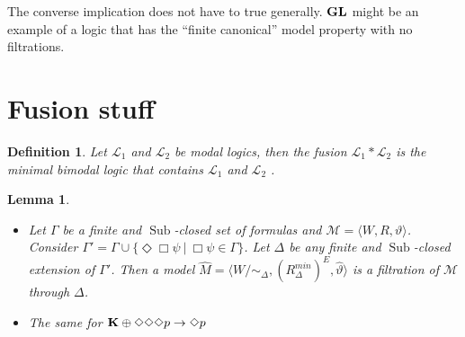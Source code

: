 \documentclass[a4paper]{article}
\theoremstyle{defin}
\newtheorem{defin}{Definition}
\theoremstyle{theorem}
\theoremstyle{prop}
\theoremstyle{lemma}
\newtheorem{lemma}{Lemma}
\theoremstyle{fact}
\theoremstyle{ex}
\theoremstyle{col}
\theoremstyle{claim}
\begin{document}
The converse implication does not have to true generally. ${\bf GL}$ might be an example of a logic that has the ``finite canonical'' model property with no filtrations.

\section{Fusion stuff}

\begin{defin}
  Let $\mathcal{L}_1$ and $\mathcal{L}_2$ be modal logics, then the fusion $\mathcal{L}_1 * \mathcal{L}_2$ is the minimal bimodal logic that contains $\mathcal{L}_1$ and $\mathcal{L}_2$ \cite{kurucz200715}.
\end{defin}

\begin{lemma}\label{extension}
  $ $

  \begin{itemize}
  \item Let $\Gamma$ be a finite and $\operatorname{Sub}$-closed set of formulas and $\mathcal{M} = \langle W, R, \vartheta \rangle$. Consider $\Gamma' = \Gamma \cup \{ \Diamond \Box \psi \: | \: \Box \psi \in \Gamma \}$. Let $\Delta$ be any finite and $\operatorname{Sub}$-closed extension of $\Gamma'$. Then a model $\widehat{M} = \langle W / \sim_{\Delta}, (R^{min}_{\Delta})^{E}, \widehat{\vartheta} \rangle$ is a filtration of $\mathcal{M}$ through $\Delta$.
  \item The same for ${\bf K} \oplus \Diamond \Diamond \Diamond p \to \Diamond p$
  \end{itemize}
\end{lemma}
\end{document}
